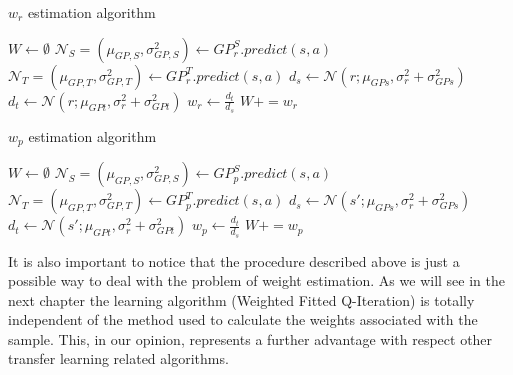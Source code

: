     \begin{algorithm}
        \caption{$w_r$ estimation algorithm}\label{rw_weight_est}
        \begin{algorithmic}[1]
            \State $W \gets \emptyset$
            \State $\mathcal{N}_{S} = (\mu_{GP,S}, \sigma_{GP,S}^{2}) \gets {GP}^{S}_{r}.predict(s,a)$
            \State $\mathcal{N}_{T} = (\mu_{GP,T}, \sigma_{GP,T}^{2}) \gets {GP}^{T}_{r}.predict(s,a)$
              \State $d_s \gets \mathcal{N}(r; \mu_{GPs}, \sigma^{2}_{r} + \sigma_{GPs}^{2})$
              \State $d_t \gets \mathcal{N}(r; \mu_{GPt}, \sigma^{2}_{r} + \sigma_{GPt}^{2})$
              \State $w_r \gets \frac{d_t}{d_s}$
              \State $W += w_r$
            \EndFor
          \EndProcedure
        \end{algorithmic}
    \end{algorithm}

    \begin{algorithm}
        \caption{$w_p$ estimation algorithm}\label{rw_transition_est}
        \begin{algorithmic}[1]
            \State $W \gets \emptyset$
            \State $\mathcal{N}_{S} = (\mu_{GP,S}, \sigma_{GP,S}^{2}) \gets {GP}^{S}_{p}.predict(s,a)$
            \State $\mathcal{N}_{T} = (\mu_{GP,T}, \sigma_{GP,T}^{2}) \gets {GP}^{T}_{p}.predict(s,a)$
              \State $d_s \gets \mathcal{N}(s'; \mu_{GPs}, \sigma^{2}_{r} + \sigma_{GPs}^{2})$
              \State $d_t \gets \mathcal{N}(s'; \mu_{GPt}, \sigma^{2}_{r} + \sigma_{GPt}^{2})$
              \State $w_p \gets \frac{d_t}{d_s}$
              \State $W += w_p$
            \EndFor
          \EndProcedure
        \end{algorithmic}
    \end{algorithm}

    \noindent It is also important to notice that the procedure described above is just a possible way to deal with the
    problem of weight estimation. As we will see in the next chapter the learning algorithm (Weighted Fitted Q-Iteration)
    is totally independent of the method used to calculate the weights associated with the sample. This, in our opinion,
    represents a further advantage with respect other transfer learning related algorithms.
